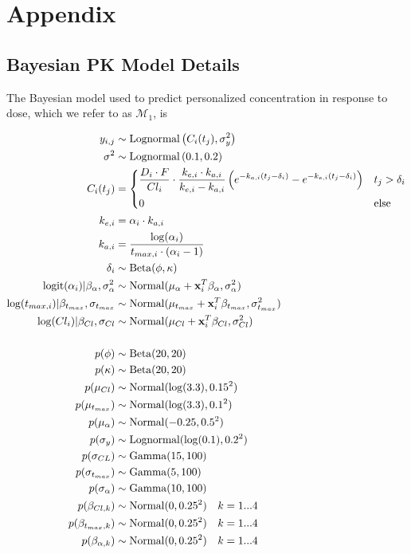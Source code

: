 \section{Appendix}\label{ap:appendix}

\subsection{Bayesian PK Model Details}

The Bayesian model used to predict personalized concentration in response to dose, which we refer to as $ \mathcal{M}_1 $, is 

\begin{align}\label{model_M1}
	y_{i,j} &\sim \operatorname{Lognormal}  \left(  C_i(t_j)  , \sigma^2_y \right)  \\
	\sigma^2 &\sim \operatorname{Lognormal} \left( 0.1, 0.2 \right)\\	
	C_i(t_j) &= \begin{dcases}
	\frac{D_{i} \cdot F}{C l_{i}} \cdot \frac{k_{e, i} \cdot k_{a, i}}{k_{e, i}-k_{a, i}}\left(e^{-k_{a, i}\left(t_{j}-\delta_{i}\right)}-e^{-k_{e, i}\left(t_{j}-\delta_{i}\right)}\right) & t_j>\delta_i \\
	0 & \mbox{else}
	\end{dcases}\\
	k_{e,i} &= \alpha_i \cdot k_{a,i}\\
	k_{a,i} &= \dfrac{\log(\alpha_i)}{t_{max, i}\cdot(\alpha_i-1)}\\
	\delta_i &\sim \operatorname{Beta}(\phi, \kappa) \\
	\operatorname{logit}(\alpha_i) \vert \beta_\alpha, \sigma^2_\alpha &\sim \operatorname{Normal}(\mu_\alpha + \mathbf{x}_i^T \beta_\alpha, \sigma^2_\alpha)\\
	\log(t_{max, i}) \vert \beta_{t_{max}}, \sigma_{t_{max}} &\sim \operatorname{Normal}(\mu_{t_{max}} + \mathbf{x}^T_i \beta_{t_{max}}, \sigma^2_{t_{max}}) \\
	\log(Cl_i) \vert \beta_{Cl}, \sigma_{Cl} &\sim \operatorname{Normal}(\mu_{Cl} + \mathbf{x}^T_i \beta_{Cl}, \sigma^2_{Cl}) \\ \nonumber \\
	p(\phi) &\sim \operatorname{Beta}(20, 20)\\
	p(\kappa) &\sim \operatorname{Beta}(20, 20)\\
	p(\mu_{Cl}) &\sim \operatorname{Normal}(\log(3.3), 0.15^2)\\
	p(\mu_{t_{max}}) &\sim \operatorname{Normal}(\log(3.3), 0.1^2)\\
	p(\mu_{\alpha}) &\sim \operatorname{Normal}(-0.25, 0.5^2)\\
	p(\sigma_y) &\sim \operatorname{Lognormal}(\log(0.1), 0.2^2)\\
	p(\sigma_{CL}) &\sim \operatorname{Gamma}(15, 100)\\
	p(\sigma_{t_{max}}) &\sim \operatorname{Gamma}(5, 100)\\
	p(\sigma_{\alpha}) &\sim \operatorname{Gamma}(10, 100)\\
	p(\beta_{Cl, k}) &\sim \operatorname{Normal}(0, 0.25^2) \quad k = 1 ...	 4\\
	p(\beta_{t_{max}, k}) &\sim \operatorname{Normal}(0, 0.25^2) \quad k = 1 ... 4\\	
	p(\beta_{\alpha, k}) &\sim \operatorname{Normal}(0, 0.25^2) \quad k = 1 ... 4
\end{align}

